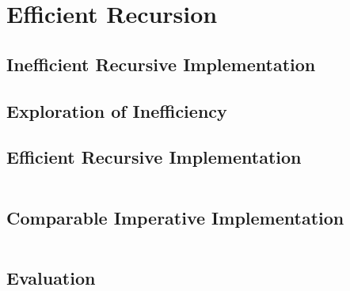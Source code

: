 \chapter{Efficient Recursion}
\label{ext:rec}



\section{Inefficient Recursive Implementation}

\section{Exploration of Inefficiency}

\section{Efficient Recursive Implementation}

\inputminted[]{csharp}{../src/csharp/ext_recursion/efficient/Program.cs}

\section{Comparable Imperative Implementation}

\inputminted[]{csharp}{../src/csharp/ext_recursion/loop/Program.cs}

\section{Evaluation}

